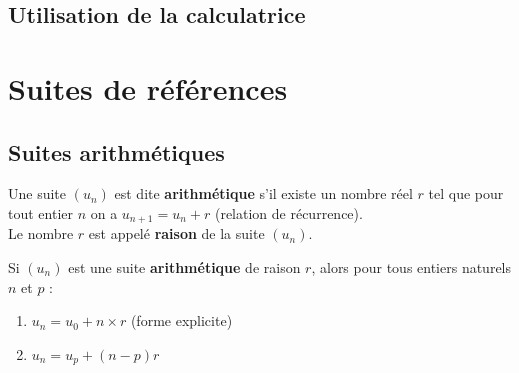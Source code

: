 \documentclass[a4paper,11pt,cours]{nsi} %
\begin{document}
\subsection*{Utilisation de la calculatrice}

\section{Suites de références}
\subsection*{Suites arithmétiques}
\begin{definition}[ ]
	Une suite $(u_n)$ est dite \textbf{arithmétique} s'il existe un nombre réel $r$ tel que pour tout entier $n$ on a $u_{n+1}=u_n+r$ \hspace{.5cm}(relation de récurrence).\\
	Le nombre $r$ est appelé \textbf{raison} de la suite $(u_n)$.
\end{definition}

\begin{propriete}[ ]
	Si $(u_n)$ est une suite \textbf{arithmétique} de raison $r$, alors pour tous entiers naturels $n$ et $p$ :
	\begin{enumerate}[label=\textbullet]
		\item 	$u_n = u_0+n\times r$ \hspace{.5cm}(forme explicite)
		\item 	$u_n=u_p+(n-p)r$	
    \end{enumerate}
\end{propriete}
\end{document}
